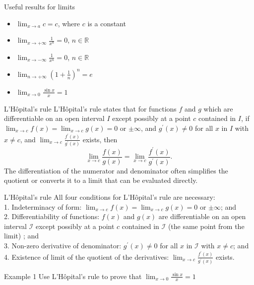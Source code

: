 \documentclass{beamer}
\begin{document}
\begin{frame}{Useful results for limits}
    \begin{itemize}
        \item $\lim _{x \rightarrow a}c=c$, where $c$ is a constant
        \item $\lim _{x \rightarrow +\infty}\frac{1}{x^n}=0$, $n\in \mathbb{R}$
        \item $\lim _{x \rightarrow -\infty}\frac{1}{x^n}=0$, $n\in \mathbb{R}$
        \item $\lim _{n \rightarrow+\infty}\left(1+\frac{1}{n}\right)^n=e$
        \item $\lim _{x \rightarrow 0} \frac{\sin x}{x}=1$
    \end{itemize}
\end{frame}

\begin{frame}{L'Hôpital's rule}
    L'Hôpital's rule states that for functions $f$ and $g$ which are differentiable on an open interval $I$ except possibly at a point $c$ contained in $I$, if $\lim _{x \rightarrow c} f(x)=\lim _{x \rightarrow c} g(x)=0$ or $\pm \infty$, and $g^{\prime}(x) \neq 0$ for all $x$ in $I$ with $x \neq c$, and $\lim _{x \rightarrow c} \frac{f^{\prime}(x)}{g^{\prime}(x)}$ exists, then
$$
\lim _{x \rightarrow c} \frac{f(x)}{g(x)}=\lim _{x \rightarrow c} \frac{f^{\prime}(x)}{g^{\prime}(x)} .
$$
The differentiation of the numerator and denominator often simplifies the quotient or converts it to a limit that can be evaluated directly.
\end{frame}

\begin{frame}{L'Hôpital's rule}
    All four conditions for L'Hôpital's rule are necessary:\\
1. Indeterminacy of form: $\lim _{x \rightarrow c} f(x)=\lim _{x \rightarrow c} g(x)=0$ or $\pm \infty$; and\\
2. Differentiability of functions: $f(x)$ and $g(x)$ are differentiable on an open interval $\mathcal{I}$ except possibly at a point $c$ contained in $\mathcal{I}$ (the same point from the limit) ; and\\
3. Non-zero derivative of denominator: $g^{\prime}(x) \neq 0$ for all $x$ in $\mathcal{I}$ with $x \neq c$; and\\
4. Existence of limit of the quotient of the derivatives: $\lim _{x \rightarrow c} \frac{f^{\prime}(x)}{g^{\prime}(x)}$ exists.
\end{frame}

\begin{frame}{Example 1}
Use L'Hôpital's rule to prove that $\lim _{x \rightarrow 0} \frac{\sin x}{x}=1$
\end{frame}
\end{document}
